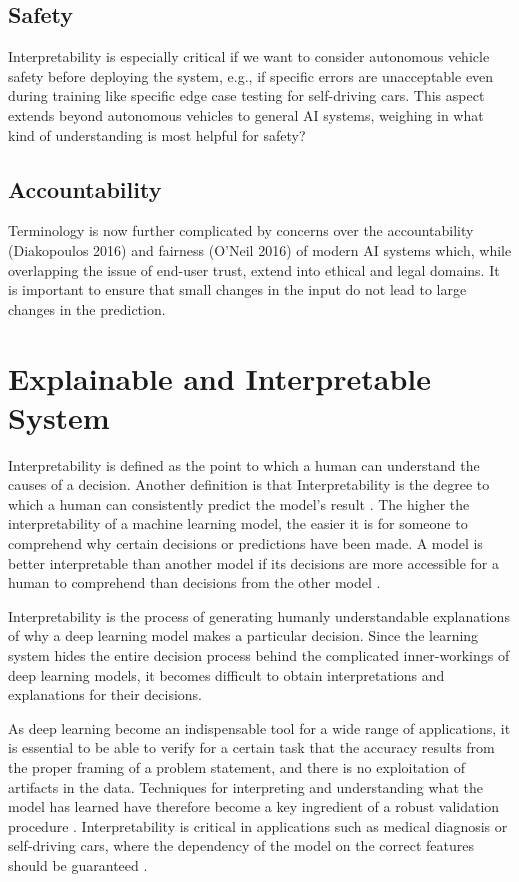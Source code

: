 \subsection{Safety}
Interpretability is especially critical if we want to consider autonomous vehicle safety before deploying the system, e.g., if specific errors are unacceptable even during training like specific edge case testing for self-driving cars. This aspect extends beyond autonomous vehicles to general AI systems, weighing in what kind of understanding is most helpful for safety?

\subsection{Accountability}
Terminology is now further complicated by concerns over the accountability (Diakopoulos 2016) and fairness (O’Neil 2016) of modern AI systems which, while overlapping the issue of end-user trust, extend into ethical and legal domains. It is important to ensure that small changes in the input do not lead to large changes in the prediction.

\section{Explainable and Interpretable System}

Interpretability is defined as the point to which a human can understand the causes of a decision. Another definition is that Interpretability is the degree to which a human can consistently predict the model’s result \cite{molnar}. The higher the interpretability of a machine learning model, the easier it is for someone to comprehend why certain decisions or predictions have been made. A model is better interpretable than another model if its decisions are more accessible for a human to comprehend than decisions from the other model \cite{molnar}.
    
Interpretability is the process of generating humanly understandable explanations of why a deep learning model makes a particular decision. Since the learning system hides the entire decision process behind the complicated inner-workings of deep learning models, it becomes difficult to obtain interpretations and explanations for their decisions.

As deep learning become an indispensable tool for a wide range of applications, it is essential to be able to verify for a certain task that the accuracy results from the proper framing of a problem statement, and there is no exploitation of artifacts in the data. Techniques for interpreting and understanding what the model has learned have therefore become a key ingredient of a robust validation procedure \citep{taylor2006methods} \citep{hansen2011visual} \citep{bach2015pixel}. Interpretability is critical in applications such as medical diagnosis or self-driving cars, where the dependency of the model on the correct features should be guaranteed \citep{Caruana:2015:IMH:2783258.2788613} \citep{bojarski2017explaining}.

